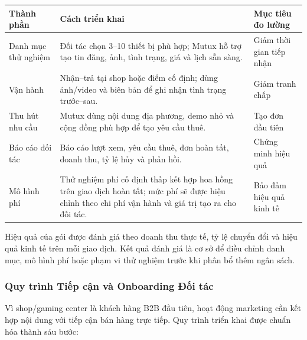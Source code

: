 \begin{longtable}{@{}p{}p{}p{}@{}}
\toprule
\textbf{Thành phần} & \textbf{Cách triển khai} & \textbf{Mục tiêu đo lường} \\
\midrule
\endhead
Danh mục thử nghiệm & Đối tác chọn 3--10 thiết bị phù hợp; Mutux hỗ trợ tạo tin đăng, ảnh, tình trạng, giá và lịch sẵn sàng. & Giảm thời gian tiếp nhận \\
Vận hành & Nhận--trả tại shop hoặc điểm cố định; dùng ảnh/video và biên bản để ghi nhận tình trạng trước--sau. & Giảm tranh chấp \\
Thu hút nhu cầu & Mutux dùng nội dung địa phương, demo nhỏ và cộng đồng phù hợp để tạo yêu cầu thuê. & Tạo đơn đầu tiên \\
Báo cáo đối tác & Báo cáo lượt xem, yêu cầu thuê, đơn hoàn tất, doanh thu, tỷ lệ hủy và phản hồi. & Chứng minh hiệu quả \\
Mô hình phí & Thử nghiệm phí cố định thấp kết hợp hoa hồng trên giao dịch hoàn tất; mức phí sẽ được hiệu chỉnh theo chi phí vận hành và giá trị tạo ra cho đối tác. & Bảo đảm hiệu quả kinh tế \\
\bottomrule
\end{longtable}

Hiệu quả của gói được đánh giá theo doanh thu thực tế, tỷ lệ chuyển đổi và hiệu quả kinh tế trên mỗi giao dịch. Kết quả đánh giá là cơ sở để điều chỉnh danh mục, mô hình phí hoặc phạm vi thử nghiệm trước khi phân bổ thêm ngân sách.

\subsubsection{Quy trình Tiếp cận và Onboarding Đối tác}

Vì shop/gaming center là khách hàng B2B đầu tiên, hoạt động marketing cần kết hợp nội dung với tiếp cận bán hàng trực tiếp. Quy trình triển khai được chuẩn hóa thành sáu bước:

